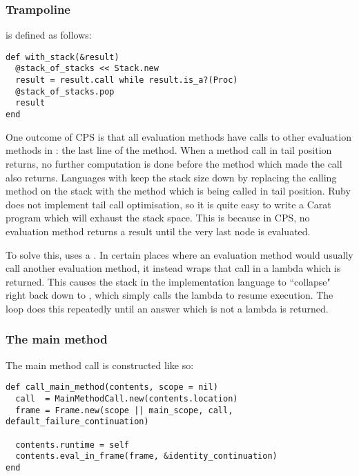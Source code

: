 \subsubsection{Trampoline}

 is defined as follows:

\begin{minipage}{\textwidth}
\begin{lstlisting}
def with_stack(&result)
  @stack_of_stacks << Stack.new
  result = result.call while result.is_a?(Proc)
  @stack_of_stacks.pop
  result
end
\end{lstlisting}
\end{minipage}

One outcome of CPS is that all evaluation methods have calls to other evaluation methods in : the last line of the method. When a method call in tail position returns, no further computation is done before the method which made the call also returns. Languages with  keep the stack size down by replacing the calling method on the stack with the method which is being called in tail position. Ruby does not implement tail call optimisation, so it is quite easy to write a Carat program which will exhaust the stack space. This is because in CPS, no evaluation method returns a result until the very last node is evaluated.

To solve this,  uses a . In certain places where an evaluation method would usually call another evaluation method, it instead wraps that call in a lambda which is returned. This causes the stack in the implementation language to ``collapse" right back down to , which simply calls the lambda to resume execution. The  loop does this repeatedly until an answer which is not a lambda is returned.

\subsubsection{The main method}

The main method call is constructed like so:

\begin{minipage}{\textwidth}
\begin{lstlisting}
def call_main_method(contents, scope = nil)
  call  = MainMethodCall.new(contents.location)
  frame = Frame.new(scope || main_scope, call, default_failure_continuation)
  
  contents.runtime = self
  contents.eval_in_frame(frame, &identity_continuation)
end
\end{lstlisting}
\end{minipage}

